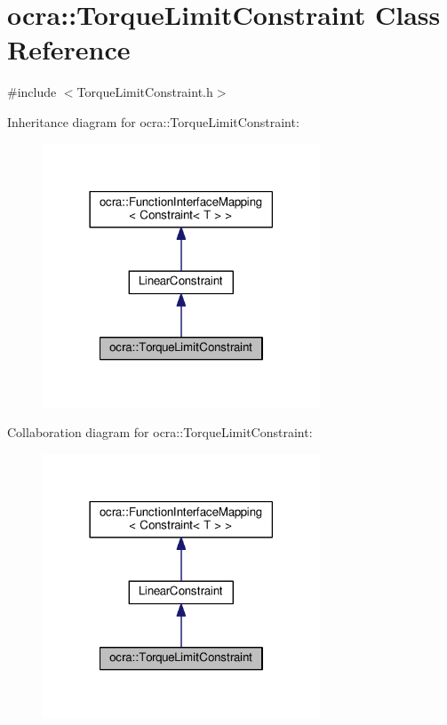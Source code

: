 \hypertarget{classocra_1_1TorqueLimitConstraint}{}\section{ocra\+:\+:Torque\+Limit\+Constraint Class Reference}
\label{classocra_1_1TorqueLimitConstraint}


{\ttfamily \#include $<$Torque\+Limit\+Constraint.\+h$>$}



Inheritance diagram for ocra\+:\+:Torque\+Limit\+Constraint\+:
\nopagebreak
\begin{figure}[H]
\begin{center}
\leavevmode
\includegraphics[width=234pt]{d5/dea/classocra_1_1TorqueLimitConstraint__inherit__graph}
\end{center}
\end{figure}


Collaboration diagram for ocra\+:\+:Torque\+Limit\+Constraint\+:
\nopagebreak
\begin{figure}[H]
\begin{center}
\leavevmode
\includegraphics[width=234pt]{d5/dd9/classocra_1_1TorqueLimitConstraint__coll__graph}
\end{center}
\end{figure}
